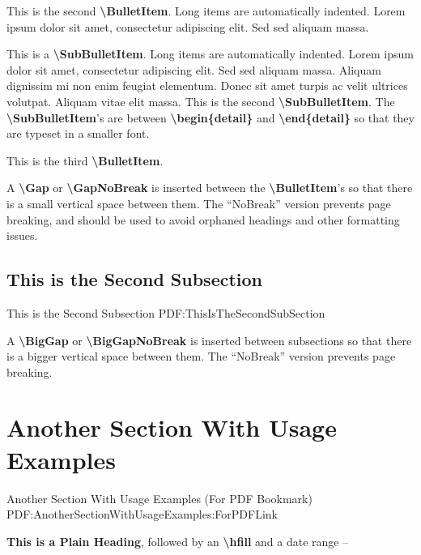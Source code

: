 \documentclass[letterpaper,MMMyyyy,nonstop]{simpleresumecv}
\newcommand{\CodeCommand}[1]{\mbox{\textbf{\textbackslash{#1}}}}
\begin{document}
\begin{body}
\GapNoBreak
\BulletItem
This is the second \CodeCommand{BulletItem}.
Long items are automatically indented.
Lorem ipsum dolor sit amet, consectetur adipiscing elit.
Sed sed aliquam massa.
\begin{detail}
\SubBulletItem
This is a \CodeCommand{SubBulletItem}.
Long items are automatically indented.
Lorem ipsum dolor sit amet, consectetur adipiscing elit.
Sed sed aliquam massa.
Aliquam dignissim mi non enim feugiat elementum.
Donec sit amet turpis ac velit ultrices volutpat.
Aliquam vitae elit massa.
\SubBulletItem
This is the second \CodeCommand{SubBulletItem}.
\SubBulletItem
The \CodeCommand{SubBulletItem}'s are between
\CodeCommand{begin\{detail\}} and
\CodeCommand{end\{detail\}} so that they are typeset in a smaller font.
\end{detail}

\Gap
\BulletItem
This is the third \CodeCommand{BulletItem}.

\Gap
\BulletItem
A \CodeCommand{Gap} or \CodeCommand{GapNoBreak} is inserted between the \CodeCommand{BulletItem}'s so that there is a small vertical space between them.
The ``NoBreak'' version prevents page breaking, and should be used to avoid orphaned headings and other formatting issues.

\BigGap
\subsection
{This is the Second Subsection}
{This is the Second Subsection}
{PDF:ThisIsTheSecondSubSection}

\GapNoBreak
\BulletItem
A \CodeCommand{BigGap} or \CodeCommand{BigGapNoBreak} is inserted between subsections so that there is a bigger vertical space between them.
The ``NoBreak'' version prevents page breaking.


\section
{Another\newline
Section\newline
With\newline
Usage\newline
Examples}
{Another Section With Usage Examples (For PDF Bookmark)}
{PDF:AnotherSectionWithUsageExamples:ForPDFLink}

\textbf{This is a Plain Heading},
followed by an \CodeCommand{hfill} and a date range
\hfill
{} --


\end{body}
\end{document}
